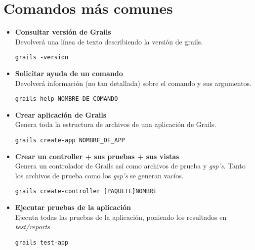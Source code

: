 \chapter{Comandos m\'as comunes}

\begin{itemize}

    \item \textbf{Consultar versi\'on de Grails}    
        \\Devolver\'a una l\'inea de texto describiendo la versi\'on de grails.
        \begin{lstlisting}[gobble=11] 
            grails -version
        \end{lstlisting}
        

    \item \textbf{Solicitar ayuda de un comando}
        \\Devolver\'a informaci\'on (no tan detallada) sobre el comando y sus argumentos.
        \begin{lstlisting}[gobble=11]
            grails help NOMBRE_DE_COMANDO
        \end{lstlisting}
        

    \item \textbf{Crear aplicaci\'on de Grails}
        \\Genera toda la estructura de archivos de una aplicaci\'on de Grails.
        \begin{lstlisting}[gobble=11]
            grails create-app NOMBRE_DE_APP
        \end{lstlisting}
        

    \item \textbf{Crear un controller + sus pruebas + sus vistas}
        \\Genera un controlador de Grails as\'i como archivos de prueba y \textit{gsp's}. Tanto los archivos de prueba como los \textit{gsp's} se generan vac\'ios.
        \begin{lstlisting}[gobble=11]
            grails create-controller [PAQUETE]NOMBRE
        \end{lstlisting}
        

    \item \textbf{Ejecutar pruebas de la aplicaci\'on}
        \\Ejecuta todas las pruebas de la aplicaci\'on, poniendo los resultados en \textit{test/reports}
        \begin{lstlisting}[gobble=11]
            grails test-app
        \end{lstlisting}
        


\end{itemize}
